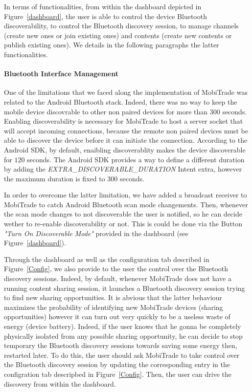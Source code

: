 In terms of functionalities, from within the dashboard depicted in Figure~\ref{dashboard}, the user is able to control the device Bluetooth discoverability, to control 
the Bluetooth discovery session, to manage channels (create new ones or join existing ones) and contents (create new contents or publish existing ones). We details in the following paragraphs the latter functionalities.

\paragraph{Bluetooth Interface Management}

One of the limitations that we faced along the implementation of MobiTrade was related to the Android Bluetooth stack. Indeed, there
was no way to keep the mobile device discovrable to other non paired devices for more than 300 seconds. Enabling discoverability is necessary for MobiTrade to host a server socket that will accept incoming connections, because the remote non paired devices must be able to discover the device before it can initiate the connection. According to the Android SDK, by default, enaibling discoverablity makes the device discoverable for $120$ seconds. The Android SDK provides a way to define a different duration by adding the \emph{EXTRA\_DISCOVERABLE\_DURATION} Intent extra, however the maximum duration is fixed to 300 seconds.

In order to overcome the latter limitation, we have added a broadcast receiver to MobiTrade to catch Android Bluetooth scan mode changements. Then, whenever the scan mode changes to not discoverable the user is notified, so he can decide wether to re-enable discoverability or not. This is could be done via the Button \emph{"Turn On Discoverable Mode"} provided in the dashboard (see Figure~\ref{dashboard}).

Through the dashboard as well as the configuration tab described in Figure~\ref{Config}, we also provide to the user the control over the Bluetooth discovery sessions. Indeed, by default, whenever MobiTrade does not have a running content sharing session, it launches a Bluetooth discovery session trying to find new sharing opportunities. It is abvious that the latter behaviour maximizes the probability of identifying new MobiTrade devices (sharing opportunities) however it can turn out very quickly to be a useless waste of energy (device battery). Indeed, if the user knows that he gonna be completely physically isolated from any possible sharing opportunity, he can decide to stop temporary the Bluetooth discovery sessions towards saving some energy then, restarted later. To do this, the user should ask MobiTrade to take control over the Bluetooth discovery session by updating the corresponding entry in the configration tab descripbed in Figure~\ref{Config}. Then, the user can drive the discovery from within the dashboard.

